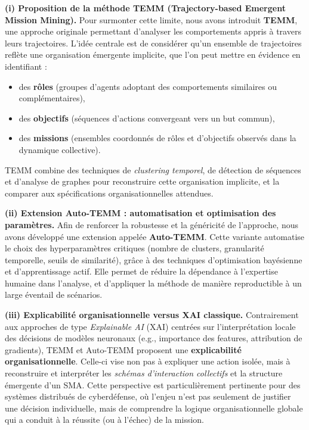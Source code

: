 \medskip
\noindent
\textbf{(i) Proposition de la méthode TEMM (Trajectory-based Emergent Mission Mining).}
Pour surmonter cette limite, nous avons introduit \textbf{TEMM}, une approche originale permettant d’analyser les comportements appris à travers leurs trajectoires.
L’idée centrale est de considérer qu’un ensemble de trajectoires reflète une organisation émergente implicite, que l’on peut mettre en évidence en identifiant :
\begin{itemize}
  \item des \textbf{rôles} (groupes d’agents adoptant des comportements similaires ou complémentaires),
  \item des \textbf{objectifs} (séquences d’actions convergeant vers un but commun),
  \item des \textbf{missions} (ensembles coordonnés de rôles et d’objectifs observés dans la dynamique collective).
\end{itemize}
TEMM combine des techniques de \textit{clustering temporel}, de détection de séquences et d’analyse de graphes pour reconstruire cette organisation implicite, et la comparer aux spécifications organisationnelles attendues.

\medskip
\noindent
\textbf{(ii) Extension Auto-TEMM : automatisation et optimisation des paramètres.}
Afin de renforcer la robustesse et la généricité de l’approche, nous avons développé une extension appelée \textbf{Auto-TEMM}.
Cette variante automatise le choix des hyperparamètres critiques (nombre de clusters, granularité temporelle, seuils de similarité), grâce à des techniques d’optimisation bayésienne et d’apprentissage actif.
Elle permet de réduire la dépendance à l’expertise humaine dans l’analyse, et d’appliquer la méthode de manière reproductible à un large éventail de scénarios.

\medskip
\noindent
\textbf{(iii) Explicabilité organisationnelle versus XAI classique.}
Contrairement aux approches de type \textit{Explainable AI} (XAI) centrées sur l’interprétation locale des décisions de modèles neuronaux (e.g., importance des features, attribution de gradients), TEMM et Auto-TEMM proposent une \textbf{explicabilité organisationnelle}.
Celle-ci vise non pas à expliquer une action isolée, mais à reconstruire et interpréter les \textit{schémas d’interaction collectifs} et la structure émergente d’un SMA.
Cette perspective est particulièrement pertinente pour des systèmes distribués de cyberdéfense, où l’enjeu n’est pas seulement de justifier une décision individuelle, mais de comprendre la logique organisationnelle globale qui a conduit à la réussite (ou à l’échec) de la mission.

